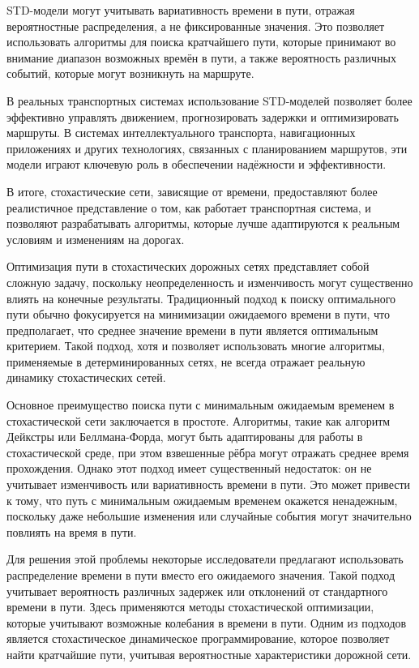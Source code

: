 STD-модели могут учитывать вариативность времени в пути, отражая вероятностные распределения, а не фиксированные значения. Это позволяет использовать алгоритмы для поиска кратчайшего пути, которые принимают во внимание диапазон возможных времён в пути, а также вероятность различных событий, которые могут возникнуть на маршруте.

В реальных транспортных системах использование STD-моделей позволяет более эффективно управлять движением, прогнозировать задержки и оптимизировать маршруты. В системах интеллектуального транспорта, навигационных приложениях и других технологиях, связанных с планированием маршрутов, эти модели играют ключевую роль в обеспечении надёжности и эффективности.

В итоге, стохастические сети, зависящие от времени, предоставляют более реалистичное представление о том, как работает транспортная система, и позволяют разрабатывать алгоритмы, которые лучше адаптируются к реальным условиям и изменениям на дорогах.






Оптимизация пути в стохастических дорожных сетях представляет собой сложную задачу, поскольку неопределенность и изменчивость могут существенно влиять на конечные результаты. Традиционный подход к поиску оптимального пути обычно фокусируется на минимизации ожидаемого времени в пути, что предполагает, что среднее значение времени в пути является оптимальным критерием. Такой подход, хотя и позволяет использовать многие алгоритмы, применяемые в детерминированных сетях, не всегда отражает реальную динамику стохастических сетей.

Основное преимущество поиска пути с минимальным ожидаемым временем в стохастической сети заключается в простоте. Алгоритмы, такие как алгоритм Дейкстры или Беллмана-Форда, могут быть адаптированы для работы в стохастической среде, при этом взвешенные рёбра могут отражать среднее время прохождения. Однако этот подход имеет существенный недостаток: он не учитывает изменчивость или вариативность времени в пути. Это может привести к тому, что путь с минимальным ожидаемым временем окажется ненадежным, поскольку даже небольшие изменения или случайные события могут значительно повлиять на время в пути.

Для решения этой проблемы некоторые исследователи предлагают использовать распределение времени в пути вместо его ожидаемого значения. Такой подход учитывает вероятность различных задержек или отклонений от стандартного времени в пути. Здесь применяются методы стохастической оптимизации, которые учитывают возможные колебания в времени в пути. Одним из подходов является стохастическое динамическое программирование, которое позволяет найти кратчайшие пути, учитывая вероятностные характеристики дорожной сети.

